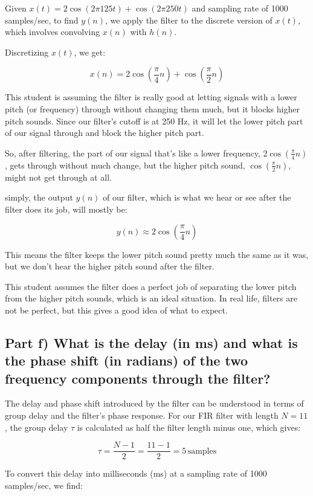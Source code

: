 \documentclass{article}
\begin{document}
Given \(x(t) = 2\cos(2\pi125t) + \cos(2\pi250t)\) and sampling rate of 1000 samples/sec, to find \(y(n)\), we apply the filter to the discrete version of \(x(t)\), which involves convolving \(x(n)\) with \(h(n)\).

Discretizing \(x(t)\), we get:

\[x(n) = 2\cos\left(\frac{\pi}{4}n\right) + \cos\left(\frac{\pi}{2}n\right)\]

This student is assuming the filter is really good at letting signals with a lower pitch (or frequency) through without changing them much, but it blocks higher pitch sounds. Since our filter's cutoff is at 250 Hz, it will let the lower pitch part of our signal through and block the higher pitch part.

So, after filtering, the part of our signal that's like a lower frequency, \(2\cos\left(\frac{\pi}{4}n\right)\), gets through without much change, but the higher pitch sound, \(\cos\left(\frac{\pi}{2}n\right)\), might not get through at all.

simply, the output \(y(n)\) of our filter, which is what we hear or see after the filter does its job, will mostly be:

\[y(n) \approx 2\cos\left(\frac{\pi}{4}n\right)\]

This means the filter keeps the lower pitch sound pretty much the same as it was, but we don't hear the higher pitch sound after the filter.

This student assumes the filter does a perfect job of separating the lower pitch from the higher pitch sounds, which is an ideal situation. In real life, filters are not be perfect, but this gives a good idea of what to expect.

\subsection*{Part f) What is the delay (in ms) and what is the phase shift (in radians) of the two frequency
components through the filter?}

The delay and phase shift introduced by the filter can be understood in terms of group delay and the filter's phase response. For our FIR filter with length \(N = 11\), the group delay \(\tau\) is calculated as half the filter length minus one, which gives:

\[ \tau = \frac{N-1}{2} = \frac{11-1}{2} = 5 \, \text{samples} \]

To convert this delay into milliseconds (ms) at a sampling rate of 1000 samples/sec, we find:
\end{document}
